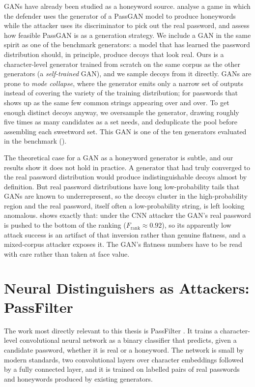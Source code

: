GANs have already been studied as a honeyword source.
\textcite{fauzi2020passgan} analyse a game in which the defender uses
the generator of a PassGAN model to produce honeywords while the
attacker uses its discriminator to pick out the real password, and
assess how feasible PassGAN is as a generation strategy. We include a
GAN in the same spirit as one of the benchmark generators: a model that
has learned the password distribution should, in principle, produce
decoys that look real. Ours is a character-level generator trained from
scratch on the same corpus as the other generators (a \emph{self-trained}
GAN), and we sample decoys from it directly. GANs are prone to
\emph{mode collapse}, where the generator emits only a narrow set of
outputs instead of covering the variety of the training distribution;
for passwords that shows up as the same few common strings appearing
over and over. To get enough distinct decoys anyway, we oversample the
generator, drawing roughly five times as many candidates as a set needs,
and deduplicate the pool before assembling each sweetword set. This GAN
is one of the ten generators evaluated in the benchmark
().

The theoretical case for a GAN as a honeyword generator is subtle, and
our results show it does not hold in practice. A generator that had
truly converged to the real password distribution would produce
indistinguishable decoys almost by definition. But real password
distributions have long low-probability tails that GANs are known to
underrepresent, so the decoys cluster in the high-probability region and
the real password, itself often a low-probability string, is left
looking anomalous.  shows exactly that: under the CNN
attacker the GAN's real password is pushed to the bottom of the ranking
($F_{\text{rank}} \approx 0.92$), so its apparently low attack success
is an artifact of that inversion rather than genuine flatness, and a
mixed-corpus attacker exposes it. The GAN's flatness numbers have to be
read with care rather than taken at face value.

\section{Neural Distinguishers as Attackers: PassFilter}
\label{sec:related-passfilter}

The work most directly relevant to this thesis is PassFilter
\parencite{dani2024passfilter}. It trains a character-level
convolutional neural network as a binary classifier that predicts,
given a candidate password, whether it is real or a honeyword. The
network is small by modern standards, two convolutional layers over
character embeddings followed by a fully connected layer, and it is
trained on labelled pairs of real passwords and honeywords produced by
existing generators.

